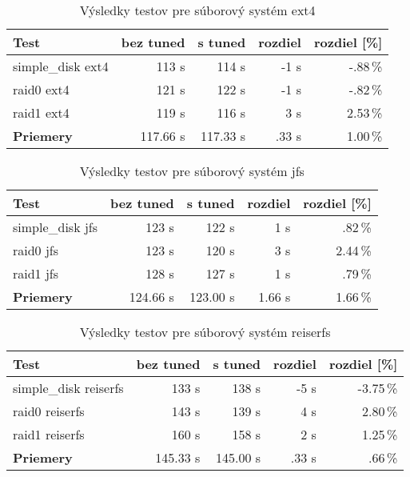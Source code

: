 \begin{table}[H]
\begin{center}
\begin{tabular}{|l|r|r|r|r|}
    \hline
    \textbf{Test} & \textbf{bez tuned} & \textbf{s tuned} & \textbf{rozdiel} & \textbf{rozdiel [\%]} \\ \hline
    simple\_disk ext4 & 113 s & 114 s & -1 s & -.88\,\% \\
    \hline
    raid0 ext4 & 121 s & 122 s & -1 s & -.82\,\% \\
    \hline
    raid1 ext4 & 119 s & 116 s & 3 s & 2.53\,\% \\
    \hline
    \textbf{Priemery} & 117.66 s & 117.33 s & .33 s & 1.00\,\% \\
    \hline
\end{tabular}
\caption{Výsledky testov pre súborový systém ext4}
\label{tab:results-ext4}
\end{center}
\end{table}

\begin{table}[H]
\begin{center}
\begin{tabular}{|l|r|r|r|r|}
    \hline
    \textbf{Test} & \textbf{bez tuned} & \textbf{s tuned} & \textbf{rozdiel} & \textbf{rozdiel [\%]} \\ \hline
    simple\_disk jfs & 123 s & 122 s & 1 s & .82\,\% \\
    \hline
    raid0 jfs & 123 s & 120 s & 3 s & 2.44\,\% \\
    \hline
    raid1 jfs & 128 s & 127 s & 1 s & .79\,\% \\
    \hline
    \textbf{Priemery} & 124.66 s & 123.00 s & 1.66 s & 1.66\,\% \\
    \hline
\end{tabular}
\caption{Výsledky testov pre súborový systém jfs}
\label{tab:results-jfs}
\end{center}
\end{table}

\begin{table}[H]
\begin{center}
\begin{tabular}{|l|r|r|r|r|}
    \hline
    \textbf{Test} & \textbf{bez tuned} & \textbf{s tuned} & \textbf{rozdiel} & \textbf{rozdiel [\%]} \\ \hline
    simple\_disk reiserfs & 133 s & 138 s & -5 s & -3.75\,\% \\
    \hline
    raid0 reiserfs & 143 s & 139 s & 4 s & 2.80\,\% \\
    \hline
    raid1 reiserfs & 160 s & 158 s & 2 s & 1.25\,\% \\
    \hline
    \textbf{Priemery} & 145.33 s & 145.00 s & .33 s & .66\,\% \\
    \hline
\end{tabular}
\caption{Výsledky testov pre súborový systém reiserfs}
\label{tab:results-reiserfs}
\end{center}
\end{table}

